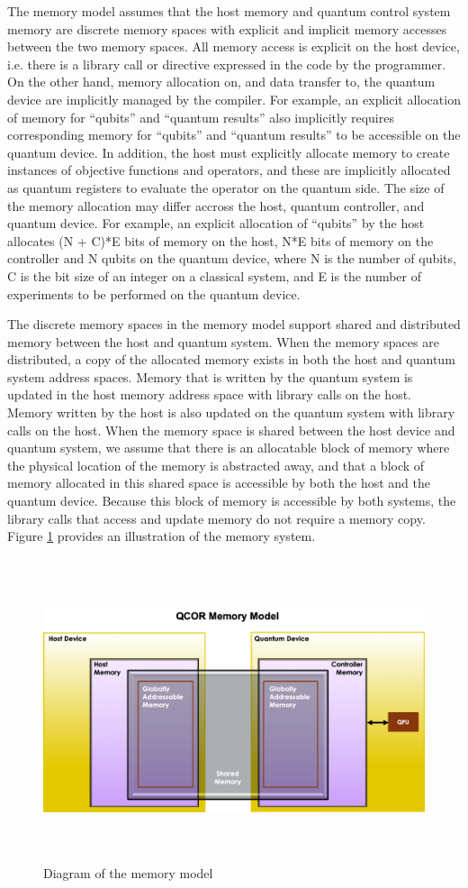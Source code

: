 The \qcor memory model assumes that the host memory and quantum control system memory are discrete memory spaces with explicit and implicit memory accesses between the two memory spaces.  
All memory access is explicit on the host device, i.e. there is a library call or directive expressed in the code by the programmer. 
On the other hand, memory allocation on, and data transfer to, the quantum device are implicitly managed by the compiler. 
For example, an explicit allocation of memory for ``qubits'' and ``quantum results'' also implicitly requires corresponding memory for ``qubits'' and ``quantum results'' to be accessible on the quantum device. 
In addition, the host must explicitly allocate memory to create instances of objective functions and operators, and these are implicitly allocated as quantum registers to evaluate the operator on the quantum side. The size of the memory allocation may differ accross the host, quantum controller, and quantum device.  For example, an explicit allocation of ``qubits'' by the host allocates (N + C)*E bits of memory on the host, N*E bits of memory on the controller and N qubits on the quantum device, where N is the number of qubits, C is the bit size of an integer on a classical system, and E is the number of experiments to be performed on the quantum device.

The discrete memory spaces in the \qcor memory model support shared and distributed memory between the host and quantum system. 
When the memory spaces are distributed, a copy of the allocated memory exists in both the host and quantum system address spaces.  
Memory that is written by the quantum system is updated in the host memory address space with library calls on the host. 
Memory written by the host is also updated on the quantum system with library calls on the host.  
When the memory space is shared between the host device and quantum system, we assume that there is an allocatable block of memory where the physical location of the memory is abstracted away, and that a block of memory allocated in this shared space is accessible by both the host and the quantum device. Because this block of memory is accessible by both systems, the library calls that access and update memory do not require a memory copy. Figure \ref{fig:mem_model} provides an illustration of the memory system.

\begin{figure}[ht]
 \centering
  \includegraphics[height=3.5in,width=5.5in]{figures/Memory_Model_Illustration_v4.png}
  \caption{Diagram of the \qcor memory model}
  \label{fig:mem_model}
\end{figure}
